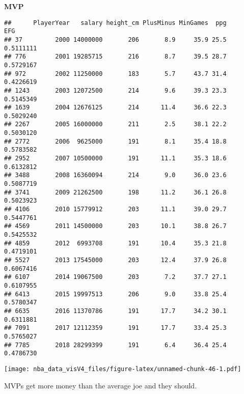 \documentclass[]{article}
\begin{document}
\textbf{MVP}

\begin{verbatim}
##      PlayerYear   salary height_cm PlusMinus MinGames  ppg       EFG
## 37         2000 14000000       206       8.9     35.9 25.5 0.5111111
## 776        2001 19285715       216       8.7     39.5 28.7 0.5729167
## 972        2002 11250000       183       5.7     43.7 31.4 0.4226619
## 1243       2003 12072500       214       9.6     39.3 23.3 0.5145349
## 1639       2004 12676125       214      11.4     36.6 22.3 0.5029240
## 2267       2005 16000000       211       2.5     38.1 22.2 0.5030120
## 2772       2006  9625000       191       8.1     35.4 18.8 0.5783582
## 2952       2007 10500000       191      11.1     35.3 18.6 0.6132812
## 3488       2008 16360094       214       9.0     36.0 23.6 0.5087719
## 3741       2009 21262500       198      11.2     36.1 26.8 0.5023923
## 4106       2010 15779912       203      11.1     39.0 29.7 0.5447761
## 4569       2011 14500000       203      10.1     38.8 26.7 0.5425532
## 4859       2012  6993708       191      10.4     35.3 21.8 0.4719101
## 5527       2013 17545000       203      12.4     37.9 26.8 0.6067416
## 6107       2014 19067500       203       7.2     37.7 27.1 0.6107955
## 6413       2015 19997513       206       9.0     33.8 25.4 0.5780347
## 6635       2016 11370786       191      17.7     34.2 30.1 0.6311881
## 7091       2017 12112359       191      17.7     33.4 25.3 0.5765027
## 7785       2018 28299399       191       6.4     36.4 25.4 0.4786730
\end{verbatim}

\texttt{[image: nba\_data\_visV4\_files/figure-latex/unnamed-chunk-46-1.pdf]}

MVPs get more money than the average joe and they should.
\end{document}
